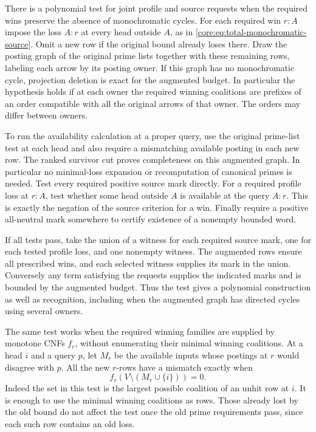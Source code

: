 There is a polynomial test for joint profile and source
requests when the required wins preserve the absence of
monochromatic cycles. For each required win $r:A$ impose
the loss $A:r$ at every head outside $A$, as in
\cref{core:eq:total-monochromatic-source}. Omit a new
row if the original bound already loses there. Draw the
posting graph of the original prime lists together with
these remaining rows, labeling each arrow by its
posting owner. If this graph has no monochromatic cycle,
projection deletion is exact for the augmented budget.
In particular the hypothesis holds if at each owner
the required winning coalitions are prefixes of an order
compatible with all the original arrows of that owner.
The orders may differ between owners.

To run the availability calculation at a proper query,
use the original prime-list test at each head and also
require a mismatching available posting in each new row.
The ranked survivor cut proves completeness on this
augmented graph. In particular no minimal-loss expansion
or recomputation of canonical primes is needed. Test
every required positive source mark directly. For a
required profile loss at $r:A$, test whether some head
outside $A$ is available at the query $A:r$. This is
exactly the negation of the source criterion for a win.
Finally require a positive all-neutral mark somewhere
to certify existence of a nonempty bounded word.

If all tests pass, take the union of a witness for each
required source mark, one for each tested profile loss,
and one nonempty witness. The augmented rows ensure
all prescribed wins, and each selected witness supplies
its mark in the union. Conversely any term satisfying
the requests supplies the indicated marks and is bounded
by the augmented budget. Thus the test gives a polynomial
construction as well as recognition, including when the
augmented graph has directed cycles using several owners.

The same test works when the required winning families
are supplied by monotone CNFs $f_r$, without enumerating
their minimal winning coalitions. At a head $i$ and a
query $p$, let $M_r$ be the available inputs whose
postings at $r$ would disagree with $p$. All the new
$r$-rows have a mismatch exactly when
\[
                  f_r(V\setminus(M_r\cup\{i\}))=0.
\]
Indeed the set in this test is the largest possible
coalition of an unhit row at $i$. It is enough to
use the minimal winning coalitions as rows. Those
already lost by the old bound do not affect the
test once the old prime requirements pass, since
each such row contains an old loss.

